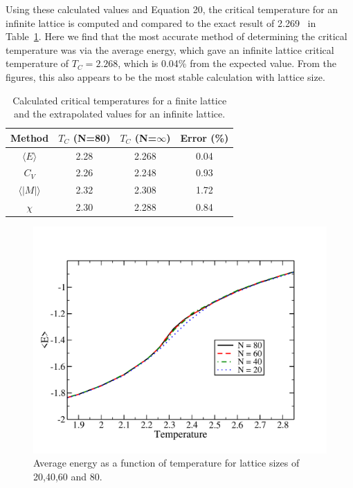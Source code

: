 \documentclass[prc,amsmath,twocolumn,superscriptaddress]{revtex4}
\begin{document}
Using these calculated values and Equation 20, the critical temperature for an infinite lattice is computed and compared to the exact result of 2.269~\cite{tc} in Table~\ref{comp}. Here we find that the most accurate method of determining the critical temperature was via the average energy, which gave an infinite lattice critical temperature of $T_C=2.268$, which is 0.04\% from the expected value. From the figures, this also appears to be the most stable calculation with lattice size.

\begin{table}[b]
\centering
\begin{tabular}{|c|c|c|c|}
\hline
Method&$T_C$ (N=80) &$T_C$ (N=$\infty$)&Error (\%) \\
\hline
$\langle E\rangle$&2.28&2.268 &0.04\\
$C_V$ &2.26&2.248&0.93\\
$\langle |M|\rangle$&2.32& 2.308&1.72\\
$\chi$&2.30&2.288&0.84\\
\hline
\end{tabular}
\caption{Calculated critical temperatures for a finite lattice and the extrapolated values for an infinite lattice.}
\label{comp}
\end{table}

\begin{figure}[t]
\includegraphics[scale=0.33]{avg_energy.pdf}
\caption{Average energy as a function of temperature for lattice sizes of 20,40,60 and 80.}
\label{avg_e}
\end{figure}
\end{document}
